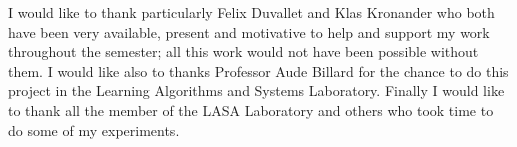 I would like to thank particularly Felix Duvallet and Klas Kronander who both have been very available, present and motivative to help and support my work throughout the semester; all this work would not have been possible without them. I would like also to thanks Professor Aude Billard for the chance to do this project in the Learning Algorithms and Systems Laboratory. Finally I would like to thank all the member of the LASA Laboratory and others who took time to do some of my experiments.